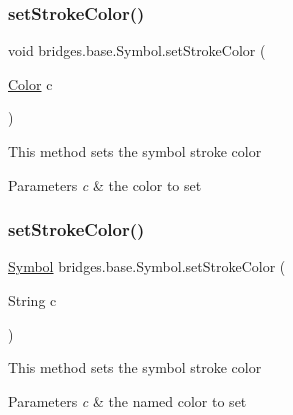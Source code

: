 \subsubsection{\texorpdfstring{set\+Stroke\+Color()}{setStrokeColor()}\hspace{0.1cm}{\footnotesize\ttfamily [1/2]}}
{\footnotesize\ttfamily void bridges.\+base.\+Symbol.\+set\+Stroke\+Color (\begin{DoxyParamCaption}\item[{\hyperlink{classbridges_1_1base_1_1_color}{Color}}]{c }\end{DoxyParamCaption})}

This method sets the symbol stroke color


\begin{DoxyParams}{Parameters}
{\em c} & the color to set \\
\hline
\end{DoxyParams}
\mbox{\label{classbridges_1_1base_1_1_symbol_ae9aa7d4e9b497875017a9b6e0eaab181}} 
\subsubsection{\texorpdfstring{set\+Stroke\+Color()}{setStrokeColor()}\hspace{0.1cm}{\footnotesize\ttfamily [2/2]}}
{\footnotesize\ttfamily \hyperlink{classbridges_1_1base_1_1_symbol}{Symbol} bridges.\+base.\+Symbol.\+set\+Stroke\+Color (\begin{DoxyParamCaption}\item[{String}]{c }\end{DoxyParamCaption})}

This method sets the symbol stroke color


\begin{DoxyParams}{Parameters}
{\em c} & the named color to set \\
\hline
\end{DoxyParams}
\mbox{\label{classbridges_1_1base_1_1_symbol_ad36224ec7cb588dbbaa8040ef59ffbfc}} 
